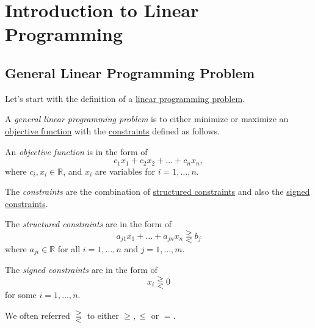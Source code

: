 \chapter{Introduction to Linear Programming}
\section{General Linear Programming Problem}
Let's start with the definition of a \hyperref[def:general-linear-programming-problem]{linear programming problem}.
\begin{definition}\label{def:general-linear-programming-problem}
	A \emph{general linear programming problem} is to either minimize or maximize an \hyperref[def:objective-function]{objective function} with the \hyperref[def:constraint]{constraints} defined as follows.

	\begin{definition}\label{def:objective-function}
		An \emph{objective function} is in the form of
		\[
			c_1 x_1 + c_2 x_2 + \ldots +c_n x_n,
		\]
		where \(c_i, x_i \in \mathbb{R}\), and \(x_{i}\) are variables for \(i = 1, \ldots, n\).
	\end{definition}

	\begin{definition}[Constraint]\label{def:constraint}
		The \emph{constraints} are the combination of \hyperref[def:structured-constraint]{structured constraints} and also the \hyperref[def:signed-constraint]{signed constraints}.
		\begin{definition}\label{def:structured-constraint}
			The \emph{structured constraints} are in the form of
			\[
				a_{j1} x_1 + \ldots + a_{jn}x_n \gtreqqless b_j
			\]
			where \(a_{ji}\in \mathbb{R} \) for all \(i=1, \ldots , n\) and \(j = 1, \ldots, m\).
		\end{definition}
		\begin{definition}\label{def:signed-constraint}
			The \emph{signed constraints} are in the form of
			\[
				x_i \gtreqqless 0
			\]
			for some \(i=1, \ldots , n\).
		\end{definition}
	\end{definition}
\end{definition}

\begin{notation}
	We often referred \(\gtreqqless \) to either \(\geq , \leq\) or \(=\).
\end{notation}

